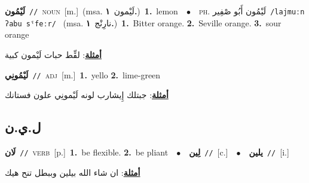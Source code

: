\documentclass[10pt,a4paper,twoside]{article} %
\begin{document}
\begin{multicols}{2}
{\setlength\topsep{0pt}\textbf{\foreignlanguage{arabic}{لَيْمُون}}\ {\color{gray}\texttt{//}\color{black}}\ \textsc{noun}\ [m.]\ \color{gray}(msa. \foreignlanguage{arabic}{لَيْمون}~\foreignlanguage{arabic}{\textbf{١.}})\color{black}\ \textbf{1.}~lemon\ \ $\bullet$\ \ \textsc{ph.} \color{gray} \foreignlanguage{arabic}{لَيْمُون أَبُو صْفِير}\color{black}\ {\color{gray}\texttt{/{\sffamily lajmuːn ʔabu sˤfeːr}/}\color{black}}\ \color{gray} (msa. \foreignlanguage{arabic}{نارِنْج}~\foreignlanguage{arabic}{\textbf{١.}})\color{black}\ \textbf{1.}~Bitter orange.  \textbf{2.}~Seville orange.  \textbf{3.}~sour orange\  \begin{flushright}\color{gray}\foreignlanguage{arabic}{\textbf{\underline{\foreignlanguage{arabic}{أمثلة}}}: لقِّط حبات لَيْمون كبية}\end{flushright}\color{black}} \vspace{2mm}

{\setlength\topsep{0pt}\textbf{\foreignlanguage{arabic}{لَيْمُونِي}}\ {\color{gray}\texttt{//}\color{black}}\ \textsc{adj}\ [m.]\ \textbf{1.}~yello  \textbf{2.}~lime-green\  \begin{flushright}\color{gray}\foreignlanguage{arabic}{\textbf{\underline{\foreignlanguage{arabic}{أمثلة}}}: جبتلك إِيشارب لونه لَيْمونِي علون فستانك}\end{flushright}\color{black}} \vspace{2mm}

\vspace{-3mm}
\subsection*{\color{blue}\foreignlanguage{arabic}{ل.ي.ن}\color{blue}{}} 

{\setlength\topsep{0pt}\textbf{\foreignlanguage{arabic}{لَان}}\ {\color{gray}\texttt{//}\color{black}}\ \textsc{verb}\ [p.]\ \textbf{1.}~be flexible.  \textbf{2.}~be pliant\ \ $\bullet$\ \ \setlength\topsep{0pt}\textbf{\foreignlanguage{arabic}{لِين}}\ {\color{gray}\texttt{//}\color{black}}\ [c.]\ \ $\bullet$\ \ \setlength\topsep{0pt}\textbf{\foreignlanguage{arabic}{يلين}}\ {\color{gray}\texttt{//}\color{black}}\ [i.]\  \begin{flushright}\color{gray}\foreignlanguage{arabic}{\textbf{\underline{\foreignlanguage{arabic}{أمثلة}}}: ان شاء الله بيلين وببطل تنح هيك}\end{flushright}\color{black}} \vspace{2mm}


\end{multicols}
\end{document}
